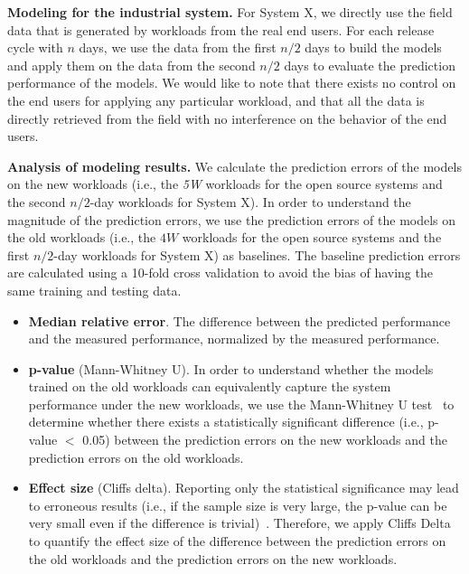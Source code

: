 \noindent\textbf{Modeling for the industrial system. }
For System X, we directly use the field data that is generated by workloads from the real end users. For each release cycle with $n$ days, we use the data from the first $n/2$ days to build the models and apply them on the data from the second $n/2$ days to evaluate the prediction performance of the models. We would like to note that there exists no control on the end users for applying any particular workload, and that all the data is directly retrieved from the field with no interference on the behavior of the end users. 

\noindent\textbf{Analysis of modeling results. }
We calculate the prediction errors of the models on the new workloads (i.e., the \emph{5W} workloads for the open source systems and the second $n/2$-day workloads for System X).
In order to understand the magnitude of the prediction errors, we use the prediction errors of the models on the old workloads (i.e., the $4W$ workloads for the open source systems and the first $n/2$-day workloads for System X) as baselines. The baseline prediction errors are calculated using a 10-fold cross validation to avoid the bias of having the same training and testing data.  
\begin{itemize}
    \item \textbf{Median relative error}. The difference between the predicted performance and the measured performance, normalized by the measured performance.
    \item \textbf{p-value} (Mann-Whitney U). In order to understand whether the models trained on the old workloads can equivalently capture the system performance under the new workloads, we use the Mann-Whitney U test~\citep{nachar2008mann} to determine whether there exists a statistically significant difference (i.e., p-value $<$ 0.05) between the prediction errors on the new workloads and the prediction errors on the old workloads. 
    \item \textbf{Effect size} (Cliff\textquotesingle s delta). Reporting only the statistical significance may lead to erroneous results (i.e., if the sample size is very large, the p-value can be very small even if the difference is trivial)~\citep{sullivan2012using}. Therefore, we apply Cliff\textquotesingle s Delta~\citep{cliff1996ordinal} to quantify the effect size of the difference between the prediction errors on the old workloads and the prediction errors on the new workloads. 
\end{itemize}

